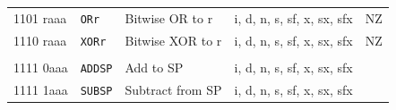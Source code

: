 \documentclass[10pt,fleqn]{book}
\begin{document}
\begin{tabular}{ l l l l l }
1101 raaa   & \verb|ORr|     & Bitwise OR to r                      & i, d, n, s, sf, x, sx, sfx  & NZ \\
1110 raaa   & \verb|XORr|    & Bitwise XOR to r                     & i, d, n, s, sf, x, sx, sfx  & NZ \\
 \\
1111 0aaa   & \verb|ADDSP|   & Add to SP                            & i, d, n, s, sf, x, sx, sfx  \\
1111 1aaa   & \verb|SUBSP|   & Subtract from SP                     & i, d, n, s, sf, x, sx, sfx  \\
\bottomrule
\end{tabular}

\newpage

\end{document}
